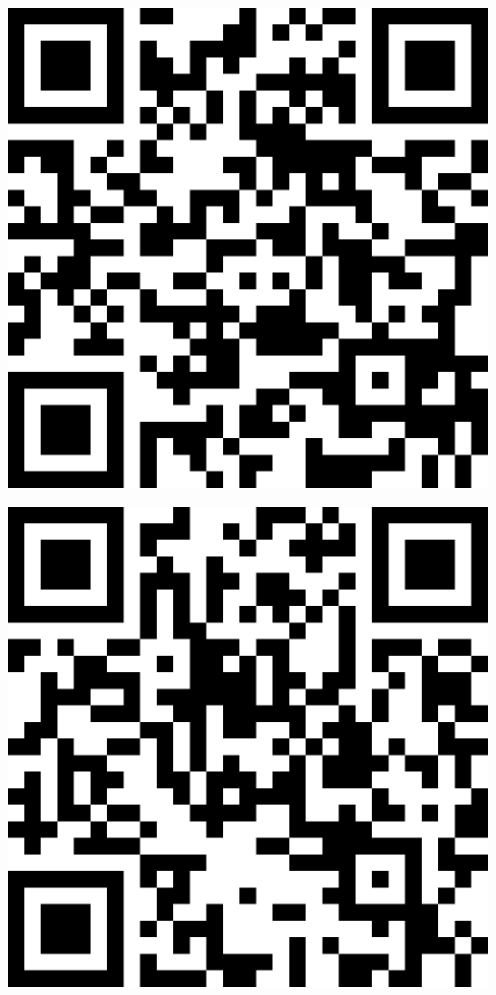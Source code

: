 \documentclass[letterpaper]{article}
\begin{document}
 \endgroup 
 \vspace*{\fill} 
 \pagebreak 
{} 
 \vspace*{\fill} 
 \begingroup 
 \centerline{\includegraphics[scale=1,width=5in,height=5in]{Room3684.png}} 
 \endgroup 
 \vspace*{\fill} 
 \pagebreak 
{} 
 \vspace*{\fill} 
 \begingroup 
 \centerline{\includegraphics[scale=1,width=5in,height=5in]{Room3688.png}} 
\end{document}
